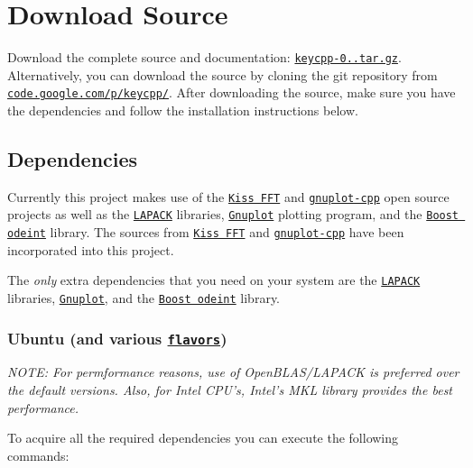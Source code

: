 \section*{Download Source}

Download the complete source and documentation\-: \href{keycpp-0.1.tar.gz}{\tt keycpp-\/0..\-tar.\-gz}. Alternatively, you can download the source by cloning the git repository from \href{http://code.google.com/p/keycpp/source/checkout}{\tt code.\-google.\-com/p/keycpp/}. After downloading the source, make sure you have the dependencies and follow the installation instructions below.

\subsection*{Dependencies}

Currently this project makes use of the \href{http://www.sourceforge.net/projects/kissfft/}{\tt Kiss F\-F\-T} and \href{http://code.google.com/p/gnuplot-cpp/}{\tt gnuplot-\/cpp} open source projects as well as the \href{http://www.netlib.org/lapack/}{\tt L\-A\-P\-A\-C\-K} libraries, \href{http://www.gnuplot.info/}{\tt Gnuplot} plotting program, and the \href{http://www.boost.org/doc/libs/1_54_0/libs/numeric/odeint/doc/html/index.html}{\tt Boost odeint} library. The sources from \href{http://www.sourceforge.net/projects/kissfft/}{\tt Kiss F\-F\-T} and \href{http://code.google.com/p/gnuplot-cpp/}{\tt gnuplot-\/cpp} have been incorporated into this project.

The {\itshape only} extra dependencies that you need on your system are the \href{http://www.netlib.org/lapack/}{\tt L\-A\-P\-A\-C\-K} libraries, \href{http://www.gnuplot.info/}{\tt Gnuplot}, and the \href{http://www.boost.org/doc/libs/1_54_0/libs/numeric/odeint/doc/html/index.html}{\tt Boost odeint} library.

\subsubsection*{Ubuntu (and various \href{https://wiki.ubuntu.com/UbuntuFlavors}{\tt flavors})}

{\itshape N\-O\-T\-E\-: For permformance reasons, use of Open\-B\-L\-A\-S/\-L\-A\-P\-A\-C\-K is preferred over the default versions. Also, for Intel C\-P\-U's, Intel's M\-K\-L library provides the best performance.}

To acquire all the required dependencies you can execute the following commands\-:

